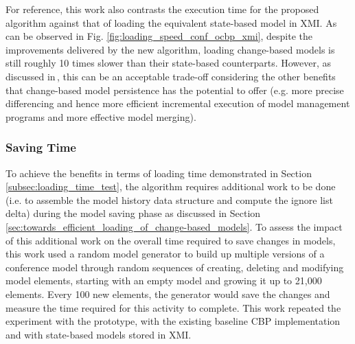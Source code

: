 \documentclass[12pt, a4paper]{report} \usepackage[titletoc]{appendix}
\begin{document}
For reference, this work also contrasts the execution time for the proposed algorithm against that of loading the equivalent state-based model in XMI. As can be observed in Fig. \ref{fig:loading_speed_conf_ocbp_xmi}, despite the improvements delivered by the new algorithm, loading change-based models is still roughly 10 times slower than their state-based counterparts. However, as discussed in\,\cite{yohannis2017turning}, this can be an acceptable trade-off considering the other benefits that change-based model persistence has the potential to offer (e.g. more precise differencing and hence more efficient incremental execution of model management programs and more effective model merging).

\subsubsection{Saving Time}
\label{subsec:saving_time_test}

To achieve the benefits in terms of loading time demonstrated in Section \ref{subsec:loading_time_test}, the algorithm requires additional work to be done (i.e. to assemble the model history data structure and compute the ignore list delta) during the model saving phase as discussed in Section \ref{sec:towards_efficient_loading_of_change-based_models}. To assess the impact of this additional work on the overall time required to save changes in models, this work used a random model generator to build up multiple versions of a conference model through random sequences of creating, deleting and modifying model elements, starting with an empty model and growing it up to 21,000 elements. Every 100 new elements, the generator would save the changes and measure the time required for this activity to complete. This work repeated the experiment with the prototype, with the existing baseline CBP implementation and with state-based models stored in XMI.
\end{document}
